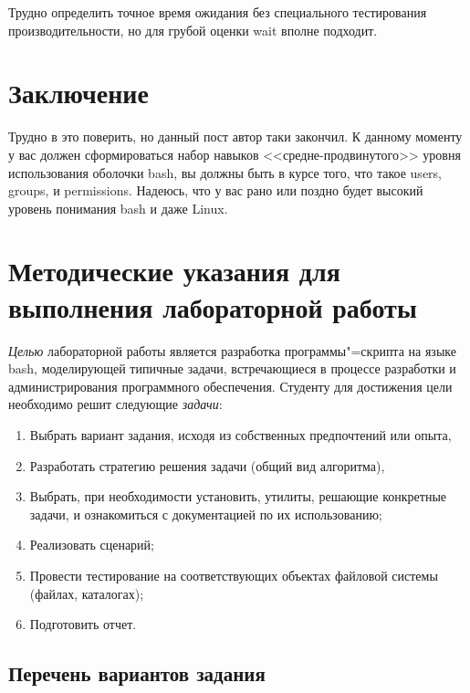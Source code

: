 \documentclass[12pt]{article}
\begin{document}
Трудно определить точное время ожидания без специального тестирования
производительности, но для грубой оценки wait вполне подходит.

\hypertarget{Conclusion}{%
  \section*{\texorpdfstring{\protect\hyperlink{Conclusion}{}Заключение}{Заключение}}\label{Conclusion}}

Трудно в это поверить, но данный пост автор таки закончил. К данному
моменту у вас должен сформироваться набор навыков <<средне-продвинутого>> уровня использования оболочки bash, вы должны быть в курсе
того, что такое users, groups, и
permissions. Надеюсь, что у вас рано или поздно будет высокий уровень
понимания bash и даже Linux.

\section{Методические указания для выполнения лабораторной работы}

\emph{Целью} лабораторной работы является разработка программы"=скрипта на языке bash, моделирующей типичные задачи, встречающиеся в процессе разработки и администрирования программного обеспечения. Студенту для достижения цели необходимо решит следующие \emph{задачи}:
\begin{enumerate}
\item Выбрать вариант задания, исходя из собственных предпочтений или опыта,
\item Разработать стратегию решения задачи (общий вид алгоритма),
\item Выбрать, при необходимости установить, утилиты, решающие конкретные задачи, и ознакомиться с документацией по их использованию;
\item Реализовать сценарий;
\item Провести тестирование на соответствующих объектах файловой системы (файлах, каталогах);
\item Подготовить отчет.
\end{enumerate}

\subsection{Перечень вариантов задания}
\end{document}
